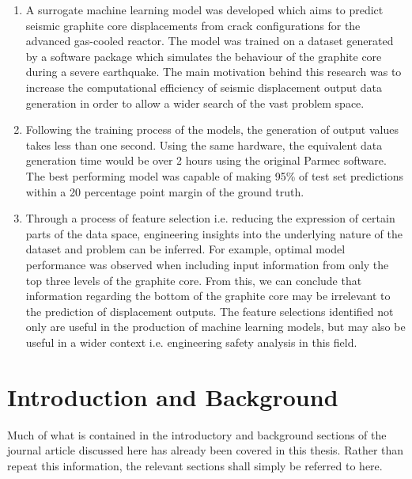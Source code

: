 \begin{enumerate}
	
\item A surrogate machine learning model was developed
which aims to predict seismic graphite core displacements from crack configurations for the advanced gas-cooled reactor. The model was trained on a dataset generated by a software package which simulates the behaviour of the graphite core during a severe earthquake.
The main motivation behind this research was to increase the computational efficiency of seismic displacement output data generation in order to allow a wider
search of the vast problem space. 

\item Following the training process of the models, the generation of output values takes less than one second. Using the same hardware, the equivalent data generation time would be over
2 hours using the original Parmec software.
The best performing model was capable of making
95\% of test set predictions within a 20 percentage point
margin of the ground truth. 

\item Through a process of feature selection i.e. reducing the expression of certain parts of the data space, engineering insights into the underlying nature of the dataset and problem can be inferred. For example, optimal model performance was observed when including input information from only the top three levels of the graphite core. From this, we can conclude that information regarding the bottom of the graphite core may be irrelevant to the prediction of displacement outputs. The feature selections identified not only are useful in the production of machine learning models, but may also be useful in a wider context i.e. engineering safety analysis in this field.


\end{enumerate}


\section{Introduction and Background}

Much of what is contained in the introductory and background sections of the journal article discussed here has already been covered in this thesis. Rather than repeat this information, the relevant sections shall simply be referred to here.


